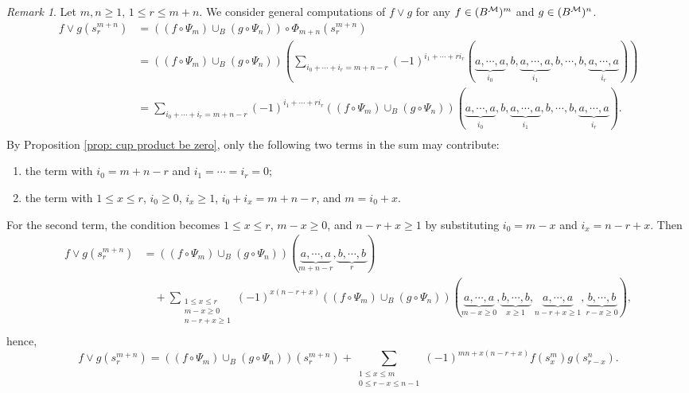 \documentclass[10pt, reqno]{amsart}
\theoremstyle{definition}
\theoremstyle{remark}
\newtheorem{remark}[theorem]{Remark}
\numberwithin{equation}{section}
\begin{document}
\begin{remark}
     Let $m,n\ge 1$, $1\le r \le m+n$. We consider general computations of $f\lor g$ for any \(f\in (B^{\mathcal{M}})^m\) and \(g\in (B^{\mathcal{M}})^n\). 
    \[\begin{aligned}
        f\lor g(s_r^{m+n})&=( (f\circ \Psi_m) \cup_B (g \circ \Psi_n)) \circ \Phi_{m+n}(s_r^{m+n})\\
        &= ((f\circ \Psi_m) \cup_B (g\circ\Psi_n)) (\sum_{i_0+\cdots+i_r = m+n-r}(-1)^{i_1+\cdots+ri_r}(\underbrace{a,\cdots,a}_{i_0},b,\underbrace{a,\cdots,a}_{i_1},b,\cdots,b,\underbrace{a,\cdots,a}_{i_r})) \\
        &= \sum_{i_0+\cdots+i_r = m+n-r}(-1)^{i_1+\cdots+ri_r} ((f\circ \Psi_m) \cup_B (g\circ\Psi_n))(\underbrace{a,\cdots,a}_{i_0},b,\underbrace{a,\cdots,a}_{i_1},b,\cdots,b,\underbrace{a,\cdots,a}_{i_r}).\\
    \end{aligned}\]
 By Proposition \ref{prop: cup product be zero}, only the following two terms in the sum may contribute:
\begin{enumerate}
    \item the term with \(i_0=m+n-r\) and \(i_1=\cdots=i_r=0\);
    \item the term with \(1\le x\le r\), \(i_0\ge 0\), \(i_x\ge 1\), \(i_0+i_x=m+n-r\), and \(m= i_0+x\).
\end{enumerate} 
For the second term, the condition becomes $1\le x\le r$, $m-x\ge 0$, and $n-r+x\ge 1$ by substituting $i_0=m-x$ and $i_x=n-r+x$. 
Then
$$ \begin{aligned}
    f\lor g(s_r^{m+n})&=((f\circ \Psi_m) \cup_B (g\circ\Psi_n))(\underbrace{a,\cdots,a}_{m+n-r},\underbrace{b,\cdots,b}_{r}) \\
        & \quad + \sum_{\substack{1\le x \le r \\ m-x\ge 0 \\ n-r+x\ge 1}} (-1)^{x(n-r+x)} ((f\circ \Psi_m) \cup_B (g\circ\Psi_n))(\underbrace{a,\cdots,a}_{m-x\ge 0},\underbrace{b,\cdots,b}_{x\ge 1},\underbrace{a,\cdots,a}_{n-r+x\ge 1},\underbrace{b,\cdots,b}_{r-x\ge 0}),\\
\end{aligned}$$
hence,
\begin{equation}\label{equ: general cup product}
    f\lor g(s_r^{m+n}) = ((f\circ \Psi_m) \cup_B (g\circ\Psi_n))(s_r^{m+n}) + \sum_{\substack{1\le x \le m \\ 0\le r-x\le n-1}} (-1)^{mn+x(n-r+x)} f(s_x^m) g(s_{r-x}^n).
\end{equation}
\end{remark}
\end{document}
